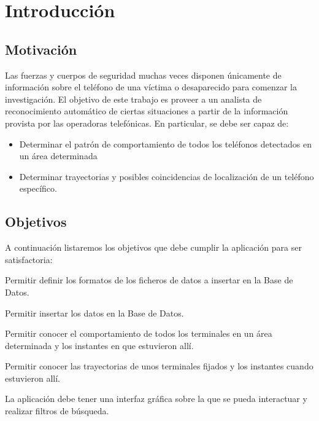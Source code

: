 \chapter{Introducción\label{CAP:INTRODUCCION}}
  \section{Motivación\label{SEC:MOTIVACION}}
    Las fuerzas y cuerpos de seguridad muchas veces disponen únicamente de información sobre el teléfono de una víctima o desaparecido para comenzar la investigación. El objetivo de este trabajo es proveer a un analista de reconocimiento automático de ciertas situaciones a partir de la información provista por las operadoras telefónicas. En particular, se debe ser capaz de:
    \begin{itemize}
    \item Determinar el patrón de comportamiento de todos los teléfonos detectados en un área determinada
    \item Determinar trayectorias y posibles coincidencias de localización de un teléfono específico.
    \end{itemize}
  
  \section{Objetivos\label{SEC:OBJETIVOS}}
    A continuación listaremos los objetivos que debe cumplir la aplicación para ser satisfactoria:
    \begin{objetive}
      \item Permitir definir los formatos de los ficheros de datos a insertar en la Base de Datos.
      \item Permitir insertar los datos en la Base de Datos.
      
      \item Permitir conocer el comportamiento de todos los terminales en un área determinada y los instantes en que estuvieron allí.
      \item Permitir conocer las trayectorias de unos terminales fijados y los instantes cuando estuvieron allí.

      \item La aplicación debe tener una interfaz gráfica sobre la que se pueda interactuar y realizar filtros de búsqueda.
    \end{objetive}
  
